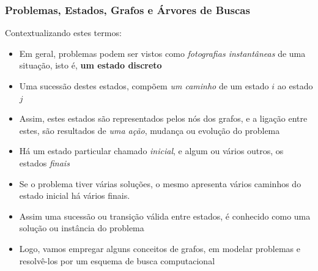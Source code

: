 \begin{frame}[fragile]
\frametitle{Problemas, Estados, Grafos e  Árvores de Buscas}

\begin{block}{Contextualizando estes termos:}

\begin{itemize}

  \item Em geral, problemas podem ser vistos como \textit{fotografias 
  instantâneas} de uma situação, isto é, \textbf{um estado discreto}
   
  \item Uma sucessão destes estados, compõem \textit{um caminho} de um estado $i$ ao estado $j$
  
  \item Assim, estes estados são representados pelos nós dos grafos, e a ligação entre 
  estes, são resultados de \textit{uma ação}, mudança ou evolução do problema
  
  \item Há um estado particular chamado \textit{inicial}, e algum ou vários outros, os estados \textit{finais}
  
  \item Se o problema tiver várias soluções,  o mesmo apresenta vários caminhos do estado inicial há vários finais.
  
  \item Assim uma sucessão ou transição válida entre estados, é conhecido como uma solução ou instância
     do problema
  
  \item Logo, vamos empregar alguns conceitos de grafos, em modelar problemas e resolvê-los 
  por um esquema de busca computacional
  
\end{itemize}

\end{block}
\end{frame}



